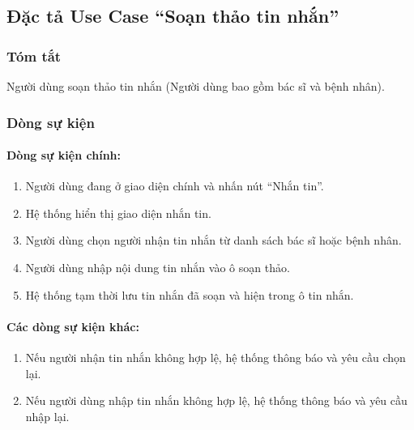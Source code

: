 \subsection{Đặc tả Use Case ``Soạn thảo tin nhắn''}

\subsubsection{Tóm tắt}
Người dùng soạn thảo tin nhắn (Người dùng bao gồm bác sĩ và bệnh nhân).

\subsubsection{Dòng sự kiện}
\paragraph{\textbf{Dòng sự kiện chính:}}
\begin{enumerate}
    \item Người dùng đang ở giao diện chính và nhấn nút ``Nhắn tin''.
    \item Hệ thống hiển thị giao diện nhắn tin.
    \item Người dùng chọn người nhận tin nhắn từ danh sách bác sĩ hoặc bệnh nhân.
    \item Người dùng nhập nội dung tin nhắn vào ô soạn thảo.
    \item Hệ thống tạm thời lưu tin nhắn đã soạn và hiện trong ô tin nhắn.
\end{enumerate}

\paragraph{\textbf{Các dòng sự kiện khác:}}
\begin{enumerate}
    \item Nếu người nhận tin nhắn không hợp lệ, hệ thống thông báo và yêu cầu chọn lại.
    \item Nếu người dùng nhập tin nhắn không hợp lệ, hệ thống thông báo và yêu cầu nhập lại.
\end{enumerate}

